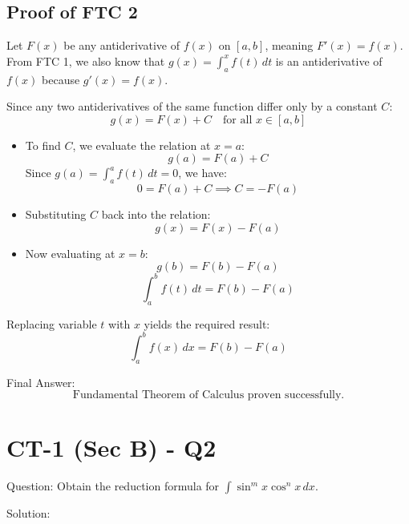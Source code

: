 \documentclass[11pt, a4paper]{article}
\begin{document}
\subsection*{Proof of FTC 2}
Let $F(x)$ be any antiderivative of $f(x)$ on $[a, b]$, meaning $F'(x) = f(x)$. 
From FTC 1, we also know that $g(x) = \int_{a}^{x} f(t) \, dt$ is an antiderivative of $f(x)$ because $g'(x) = f(x)$.

Since any two antiderivatives of the same function differ only by a constant $C$:
\[ g(x) = F(x) + C \quad \text{for all } x \in [a, b] \]
\begin{itemize}
    \item To find $C$, we evaluate the relation at $x = a$:
    \[ g(a) = F(a) + C \]
    Since $g(a) = \int_{a}^{a} f(t) \, dt = 0$, we have:
    \[ 0 = F(a) + C \implies C = -F(a) \]
    \item Substituting $C$ back into the relation:
    \[ g(x) = F(x) - F(a) \]
    \item Now evaluating at $x = b$:
    \[ g(b) = F(b) - F(a) \]
    \[ \int_{a}^{b} f(t) \, dt = F(b) - F(a) \]
\end{itemize}
Replacing variable $t$ with $x$ yields the required result:
\[ \int_{a}^{b} f(x) \, dx = F(b) - F(a) \]

Final Answer:
\[ 
\boxed{\text{Fundamental Theorem of Calculus proven successfully.}} 
\]



\section*{CT-1 (Sec B) - Q2}

Question:
Obtain the reduction formula for $\int \sin^m x \cos^n x \, dx$.

Solution:
\end{document}
